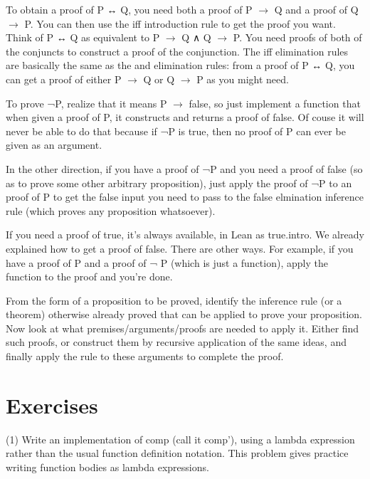 \documentclass[letterpaper,10pt,english]{sphinxmanual}
\begin{document}
To obtain a proof of P ↔ Q, you need both a proof of P \(\rightarrow\) Q and a proof
of Q \(\rightarrow\) P. You can then use the iff introduction rule to get the proof
you want. Think of P ↔ Q as equivalent to P \(\rightarrow\) Q ∧ Q \(\rightarrow\) P. You need
proofs of both of the conjuncts to construct a proof of the
conjunction. The iff elimination rules are basically the same as the
and elimination rules: from a proof of P ↔ Q, you can get a proof of
either P \(\rightarrow\) Q or Q \(\rightarrow\) P as you might need.

To prove ¬P, realize that it means P \(\rightarrow\) false, so just implement a
function that when given a proof of P, it constructs and returns a
proof of false. Of couse it will never be able to do that because if
¬P is true, then no proof of P can ever be given as an argument.

In the other direction, if you have a proof of ¬P and you need a proof
of false (so as to prove some other arbitrary proposition), just apply
the proof of ¬P to an proof of P to get the false input you need to
pass to the false elmination inference rule (which proves any
proposition whatsoever).

If you need a proof of true, it’s always available, in Lean as
true.intro. We already explained how to get a proof of false. There
are other ways. For example, if you have a proof of P and a proof of ¬
P (which is just a function), apply the function to the proof and
you’re done.

From the form of a proposition to be proved, identify the inference
rule (or a theorem) otherwise already proved that can be applied to
prove your proposition.  Now look at what premises/arguments/proofs
are needed to apply it. Either find such proofs, or construct them by
recursive application of the same ideas, and finally apply the rule to
these arguments to complete the proof.


\section{Exercises}
\label{\detokenize{15-proofs:exercises}}
(1) Write an implementation of comp (call it comp’), using a lambda
expression rather than the usual function definition notation.  This
problem gives practice writing function bodies as lambda expressions.

\begin{sphinxVerbatim}[commandchars=\\\{\}]
     
     
\end{sphinxVerbatim}
\end{document}
